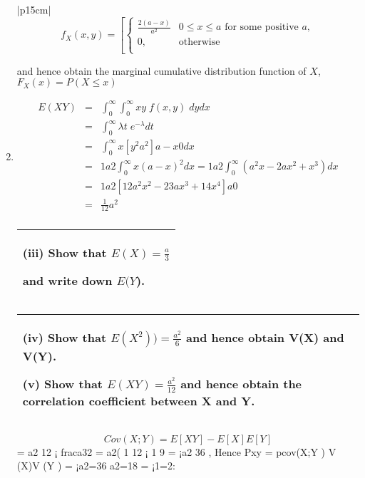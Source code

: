 \documentclass[a4paper,12pt]{article}
\begin{document}
\begin{enumerate}
\begin{table}[ht!]
\begin{tabular}{|p{15cm}|}
\[  f_X(x,y) = \left[ \begin{cases}  
\frac{2(a-x)}{a^2} &  0 \leq x  \leq a \mbox{ for some positive } a,    \\
0,  & \mbox{otherwise} \\ 
\end{cases}\]
  
 and hence obtain the marginal cumulative distribution function of $X$, $F_X(x) = P(X \leq x)$\\
\hline

      \end{tabular}
    \end{table}

\item 

\begin{eqnarray*}
E(XY) &=& \int^{\infty}_{0} \int^{\infty}_{0} xy\; f(x,y) \; dydx \\
    &=&\int^{\infty}_{0} \lambda t\;e^{-\lambda} dt \\
&=&
\int^{\infty}_{0} x[ y^2
a^2 ]a-x
0 dx \\ &=& 1
a2
\int^{\infty}_{0} x(a - x)^2dx = 1
a2
\int^{\infty}_{0}(a^2x - 2ax^2 + x^3)dx\\
&=& 1
a2 [ 1
2a^2x^2 - 2
3ax^3 + 1
4x^4]a
0\\ &=& \frac{1}{12}a^2\\
\end{eqnarray*}
\newpage
  \begin{table}[ht!]
     \centering
     \begin{tabular}{|p{15cm}|}
     \hline    
(iii) Show that $E(X) = \frac{a}{3}$

 and write down $E(Y$).         
\\ \hline
\end{tabular}
\end{table}

  \begin{table}[ht!]
     \centering
     \begin{tabular}{|p{15cm}|}
     \hline  
 (iv) Show that $E(X^2)) = \frac{a^2}{6}$
and hence obtain V(X) and V(Y).       
 
(v) Show that $E(XY) = \frac{a^2}{12}$
and hence obtain the correlation coefficient 
between X and Y.\\ \hline
\end{tabular}
\end{table}
\[Cov(X; Y ) = E[XY ] - E[X]E[Y ]\] = a2
12 ¡ fraca32 = a2( 1
12 ¡ 1
9 = ¡a2
36 ,
Hence Pxy = pcov(X;Y )
V (X)V (Y )
= ¡a2=36
a2=18 = ¡1=2:
\end{enumerate}
\end{document}
